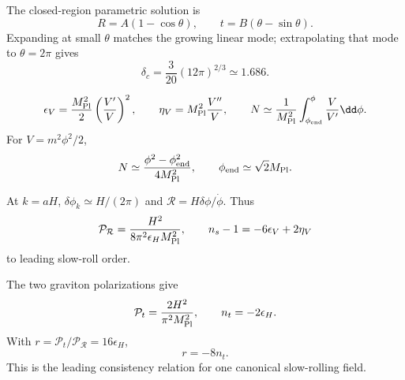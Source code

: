 \begin{solution}
The closed-region parametric solution is
\[
R=A(1-\cos\theta),\qquad t=B(\theta-\sin\theta).
\]
Expanding at small \(\theta\) matches the growing linear mode; extrapolating
that mode to \(\theta=2\pi\) gives
\[
\delta_c=\frac3{20}(12\pi)^{2/3}\simeq1.686.
\]
\end{solution}

\begin{solution}
\[
\epsilon_V=\frac{M_{\rm Pl}^2}{2}\left(\frac{V'}V\right)^2,\qquad
\eta_V=M_{\rm Pl}^2\frac{V''}V,\qquad
N\simeq\frac1{M_{\rm Pl}^2}\int_{\phi_{\rm end}}^\phi\frac{V}{V'}\dd\phi.
\]
For \(V=m^2\phi^2/2\),
\[
N\simeq\frac{\phi^2-\phi_{\rm end}^2}{4M_{\rm Pl}^2},
\qquad \phi_{\rm end}\simeq\sqrt2M_{\rm Pl}.
\]
\end{solution}

\begin{solution}
At \(k=aH\), \(\delta\phi_k\simeq H/(2\pi)\) and
\(\mathcal R=H\delta\phi/\dot\phi\).  Thus
\[
\mathcal P_{\mathcal R}
=\frac{H^2}{8\pi^2\epsilon_HM_{\rm Pl}^2},
\qquad
n_s-1=-6\epsilon_V+2\eta_V
\]
to leading slow-roll order.
\end{solution}

\begin{solution}
The two graviton polarizations give
\[
\mathcal P_t=\frac{2H^2}{\pi^2M_{\rm Pl}^2},\qquad
n_t=-2\epsilon_H.
\]
With \(r=\mathcal P_t/\mathcal P_{\mathcal R}=16\epsilon_H\),
\[
r=-8n_t.
\]
This is the leading consistency relation for one canonical slow-rolling
field.
\end{solution}
